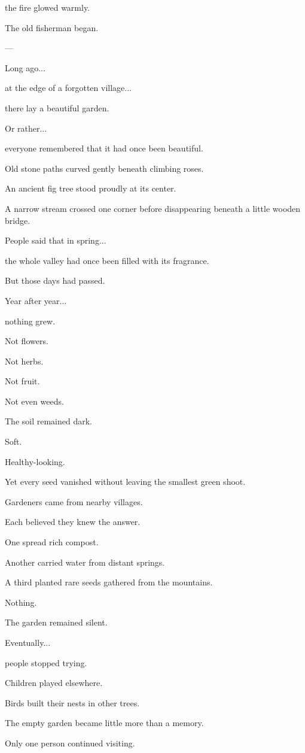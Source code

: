 \documentclass[12pt,openany]{book}
\begin{document}
the fire glowed warmly.

The old fisherman began.

---

Long ago...

at the edge of a forgotten village...

there lay a beautiful garden.

Or rather...

everyone remembered that it had once been beautiful.

Old stone paths curved gently beneath climbing roses.

An ancient fig tree stood proudly at its center.

A narrow stream crossed one corner before disappearing beneath a little wooden bridge.

People said that in spring...

the whole valley had once been filled with its fragrance.

But those days had passed.

Year after year...

nothing grew.

Not flowers.

Not herbs.

Not fruit.

Not even weeds.

The soil remained dark.

Soft.

Healthy-looking.

Yet every seed vanished without leaving the smallest green shoot.

Gardeners came from nearby villages.

Each believed they knew the answer.

One spread rich compost.

Another carried water from distant springs.

A third planted rare seeds gathered from the mountains.

Nothing.

The garden remained silent.

Eventually...

people stopped trying.

Children played elsewhere.

Birds built their nests in other trees.

The empty garden became little more than a memory.

Only one person continued visiting.
\end{document}
